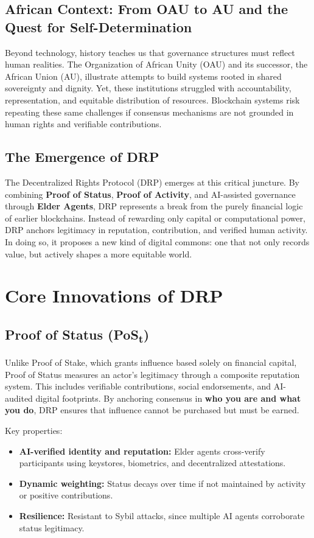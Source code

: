 \documentclass[11pt,a4paper]{article}
\begin{document}
\subsection{African Context: From OAU to AU and the Quest for Self-Determination}
Beyond technology, history teaches us that governance structures must reflect human realities. The Organization of African Unity (OAU) and its successor, the African Union (AU), illustrate attempts to build systems rooted in shared sovereignty and dignity. Yet, these institutions struggled with accountability, representation, and equitable distribution of resources. Blockchain systems risk repeating these same challenges if consensus mechanisms are not grounded in human rights and verifiable contributions.

\subsection{The Emergence of DRP}
The Decentralized Rights Protocol (DRP) emerges at this critical juncture. By combining \textbf{Proof of Status}, \textbf{Proof of Activity}, and AI-assisted governance through \textbf{Elder Agents}, DRP represents a break from the purely financial logic of earlier blockchains. Instead of rewarding only capital or computational power, DRP anchors legitimacy in reputation, contribution, and verified human activity. In doing so, it proposes a new kind of digital commons: one that not only records value, but actively shapes a more equitable world.

\section{Core Innovations of DRP}

\subsection{Proof of Status (PoS\textsubscript{t})}
Unlike Proof of Stake, which grants influence based solely on financial capital, Proof of Status measures an actor's legitimacy through a composite reputation system. This includes verifiable contributions, social endorsements, and AI-audited digital footprints. By anchoring consensus in \textbf{who you are and what you do}, DRP ensures that influence cannot be purchased but must be earned.

Key properties:
\begin{itemize}
    \item \textbf{AI-verified identity and reputation:} Elder agents cross-verify participants using keystores, biometrics, and decentralized attestations.
    \item \textbf{Dynamic weighting:} Status decays over time if not maintained by activity or positive contributions.
    \item \textbf{Resilience:} Resistant to Sybil attacks, since multiple AI agents corroborate status legitimacy.
\end{itemize}
\end{document}
